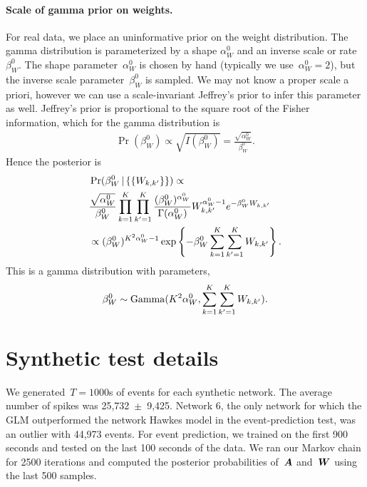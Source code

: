 \paragraph{Scale of gamma prior on weights.}
For real data, we place an uninformative prior on the weight
distribution. The gamma distribution is parameterized by a shape
$\alpha_W^0$ and an inverse scale or rate $\beta_W^{0}$. The shape
parameter~${\alpha_W^0}$ is chosen by hand (typically we
use~${\alpha_W^0=2}$), but the inverse scale parameter~${\beta_W^0}$
is sampled. We may not know a proper scale a priori, however we can
use a scale-invariant Jeffrey's prior to infer this parameter as
well. Jeffrey's prior is proportional to the square root of the Fisher
information, which for the gamma distribution is
\begin{align*}
  \Pr(\beta_W^0) \propto \sqrt{I(\beta_W^0)} = \frac{\sqrt{\alpha_W^0}}{\beta_W^0}.
\end{align*}
Hence the posterior is 
\begin{align*}
&\Pr(\beta_W^0 \,|\, \{\{W_{k,k'}\}\} ) \propto \\
&\frac{\sqrt{\alpha_W^0}}{\beta_W^0}\prod_{k=1}^K\prod_{k'=1}^K \frac{(\beta_W^0)^{\alpha_W^0}}{\Gamma(\alpha_W^0)} W_{k,k'}^{\alpha_W^0-1}e^{-\beta_W^0 W_{k,k'}} \\
&\propto (\beta_W^0)^{K^2\alpha_W^0-1} \exp\left\{-\beta_W^0 \sum_{k=1}^{K}\sum_{k'=1}^K W_{k,k'}\right\}.
\end{align*}
This is a gamma distribution with parameters,
\begin{align*}
\beta_W^0\sim\mathrm{Gamma}(K^2\alpha_W^0,\sum_{k=1}^K\sum_{k'=1}^K W_{k,k'}).
\end{align*}


\section{Synthetic test details}
We generated~${T=1000}$s of events for each synthetic network. The
average number of spikes was 25,732~$\pm$~9,425. Network 6, the only
network for which the GLM outperformed the network Hawkes model in the
event-prediction test, was an outlier with 44,973 events. For event
prediction, we trained on the first 900 seconds and tested on the last
100 seconds of the data. We ran our Markov chain for 2500 iterations
and computed the posterior probabilities of~$\boldsymbol{A}$ and~$\boldsymbol{W}$ using the
last 500 samples.

